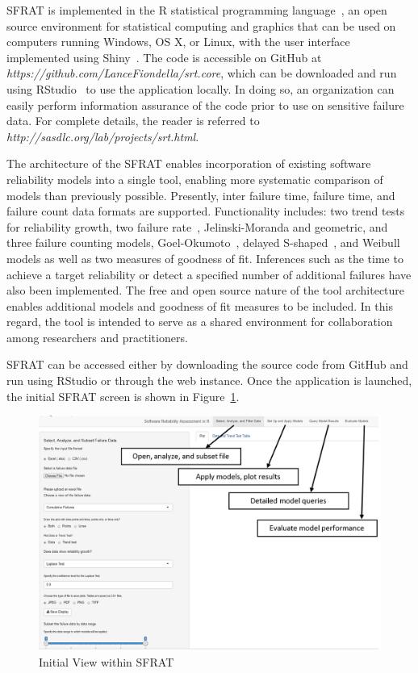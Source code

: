\documentclass[conference]{IEEEtran}
\begin{document}
SFRAT is implemented in the R statistical programming language~\cite{}, an open source environment for statistical computing and graphics that can be used on computers running Windows, OS X, or Linux, with the user interface implemented using Shiny~\cite{}. The code is accessible on GitHub at \textit{https://github.com/LanceFiondella/srt.core}, which can be downloaded and run using RStudio~\cite{} to use the application locally. In doing so, an organization can easily perform information assurance of the code prior to use on sensitive failure data. For complete details, the reader is referred to \textit{http://sasdlc.org/lab/projects/srt.html}.

The architecture of the SFRAT enables incorporation of existing software reliability models into a single tool, enabling more systematic comparison of models than previously possible. Presently, inter failure time, failure time, and failure count data formats are supported. Functionality includes: two trend tests for reliability growth, two failure rate~\cite{BookHoSRE}, Jelinski-Moranda and geometric, and three failure counting models, Goel-Okumoto~\cite{goel1985software}, delayed S-shaped~\cite{artTR1986_19}, and Weibull~\cite{artNHPPsurvey} models as well as two measures of goodness of fit. Inferences such as the time to achieve a target reliability or detect a specified number of additional failures have also been implemented. The free and open source nature of the tool architecture enables additional models and goodness of fit measures to be included. In this regard, the tool is intended to serve as a shared environment for collaboration among researchers and practitioners.

SFRAT can be accessed either by downloading the source code from GitHub and run using RStudio or through the web instance. Once the application is launched, the initial SFRAT screen is shown in Figure~\ref{fig_DefaultView}.
\begin{figure}[!h]
\centering
\includegraphics[width=\columnwidth]{Figures/DefaultView}
\caption{Initial View within SFRAT}
\label{fig_DefaultView}
\end{figure}
\end{document}
